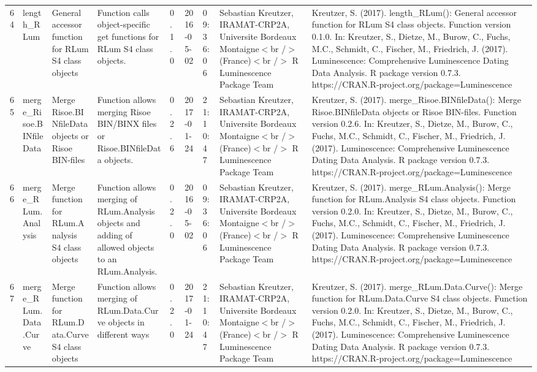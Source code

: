 \begin{table}[ht]
\begin{tabular}{rllllllll}
  64 & length\_RLum & General accessor function for RLum S4 class objects & Function calls object-specific get functions for RLum S4 class objects. & 0.1.0 & 2016-05-02 & 09:36:06
 & Sebastian Kreutzer, IRAMAT-CRP2A, Universite Bordeaux Montaigne$<$br /$>$ (France)$<$br /$>$  R Luminescence Package Team & Kreutzer, S. (2017). length\_RLum(): General accessor function for RLum S4 class objects. Function version 0.1.0. In: Kreutzer, S., Dietze, M., Burow, C., Fuchs, M.C., Schmidt, C., Fischer, M., Friedrich, J. (2017). Luminescence: Comprehensive Luminescence Dating Data Analysis. R package version 0.7.3. https://CRAN.R-project.org/package=Luminescence
 \\ 
  65 & merge\_Risoe.BINfileData & Merge Risoe.BINfileData objects or Risoe BIN-files & Function allows merging Risoe BIN/BINX files or Risoe.BINfileData objects. & 0.2.6 & 2017-01-24 & 21:10:47
 & Sebastian Kreutzer, IRAMAT-CRP2A, Universite Bordeaux Montaigne$<$br /$>$ (France)$<$br /$>$  R Luminescence Package Team & Kreutzer, S. (2017). merge\_Risoe.BINfileData(): Merge Risoe.BINfileData objects or Risoe BIN-files. Function version 0.2.6. In: Kreutzer, S., Dietze, M., Burow, C., Fuchs, M.C., Schmidt, C., Fischer, M., Friedrich, J. (2017). Luminescence: Comprehensive Luminescence Dating Data Analysis. R package version 0.7.3. https://CRAN.R-project.org/package=Luminescence
 \\ 
  66 & merge\_RLum.Analysis & Merge function for RLum.Analysis S4 class objects & Function allows merging of RLum.Analysis objects and adding of allowed objects to an RLum.Analysis. & 0.2.0 & 2016-05-02 & 09:36:06
 & Sebastian Kreutzer, IRAMAT-CRP2A, Universite Bordeaux Montaigne$<$br /$>$ (France)$<$br /$>$  R Luminescence Package Team & Kreutzer, S. (2017). merge\_RLum.Analysis(): Merge function for RLum.Analysis S4 class objects. Function version 0.2.0. In: Kreutzer, S., Dietze, M., Burow, C., Fuchs, M.C., Schmidt, C., Fischer, M., Friedrich, J. (2017). Luminescence: Comprehensive Luminescence Dating Data Analysis. R package version 0.7.3. https://CRAN.R-project.org/package=Luminescence
 \\ 
  67 & merge\_RLum.Data.Curve & Merge function for RLum.Data.Curve S4 class objects & Function allows merging of RLum.Data.Curve objects in different ways & 0.2.0 & 2017-01-24 & 21:10:47
 & Sebastian Kreutzer, IRAMAT-CRP2A, Universite Bordeaux Montaigne$<$br /$>$ (France)$<$br /$>$  R Luminescence Package Team & Kreutzer, S. (2017). merge\_RLum.Data.Curve(): Merge function for RLum.Data.Curve S4 class objects. Function version 0.2.0. In: Kreutzer, S., Dietze, M., Burow, C., Fuchs, M.C., Schmidt, C., Fischer, M., Friedrich, J. (2017). Luminescence: Comprehensive Luminescence Dating Data Analysis. R package version 0.7.3. https://CRAN.R-project.org/package=Luminescence

\end{tabular}
\end{table}
